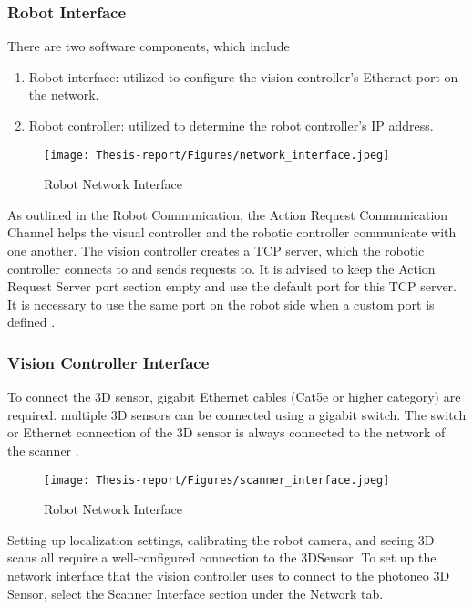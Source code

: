 \documentclass[12pt]{article}
\begin{document}
\subsubsection{Robot Interface}
There are two software components, which include
\begin{enumerate}
    \item   Robot interface: utilized to configure the vision controller's Ethernet port on the network\cite{ref2}.
    \item   Robot controller: utilized to determine the robot controller's IP address\cite{ref2}.
\end{enumerate}
\begin{figure}[h]
    \centering
    \texttt{[image: Thesis-report/Figures/network\_interface.jpeg]}
    \caption{Robot Network Interface\cite{ref2}}
    \label{fig:network-interface}
\end{figure}
 As outlined in the Robot Communication, the Action Request Communication Channel helps the visual controller and the robotic controller communicate with one another.  The vision controller creates a TCP server, which the robotic controller connects to and sends requests to.
 It is advised to keep the Action Request Server port section empty and use the default port for this TCP server.  It is necessary to use the same port on the robot side when a custom port is defined \cite{ref2}.

\subsubsection{Vision Controller Interface}
To connect the 3D sensor, gigabit Ethernet cables (Cat5e or higher category) are required.  multiple 3D sensors can be connected using a gigabit switch.  The switch or Ethernet connection of the 3D sensor is always connected to the network of the scanner \cite{ref2}.
\begin{figure}[h]
    \centering
    \texttt{[image: Thesis-report/Figures/scanner\_interface.jpeg]}
    \caption{Robot Network Interface \cite{ref2}}
    \label{fig:scanner-interface}
\end{figure}

 Setting up localization settings, calibrating the robot camera, and seeing 3D scans all require a well-configured connection to the 3DSensor. To set up the network interface that the vision controller uses to connect to the photoneo 3D Sensor, select the Scanner Interface section under the Network tab\cite{ref2}.\\
\end{document}
